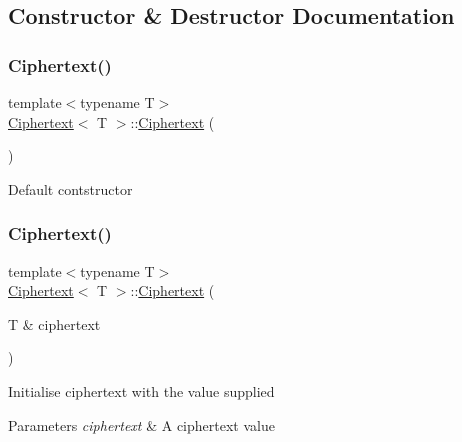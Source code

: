 \subsection{Constructor \& Destructor Documentation}
\mbox{\label{classCiphertext_a658bbd14ee1a3683309878e54b575c8f}} 
\subsubsection{\texorpdfstring{Ciphertext()}{Ciphertext()}\hspace{0.1cm}{\footnotesize\ttfamily [1/2]}}
{\footnotesize\ttfamily template$<$typename T$>$ \\
\hyperlink{classCiphertext}{Ciphertext}$<$ T $>$\+::\hyperlink{classCiphertext}{Ciphertext} (\begin{DoxyParamCaption}{ }\end{DoxyParamCaption})\hspace{0.3cm}{\ttfamily [inline]}}

Default contstructor \mbox{\label{classCiphertext_ab04b602d489978f0e511d797b8a8157d}} 
\subsubsection{\texorpdfstring{Ciphertext()}{Ciphertext()}\hspace{0.1cm}{\footnotesize\ttfamily [2/2]}}
{\footnotesize\ttfamily template$<$typename T$>$ \\
\hyperlink{classCiphertext}{Ciphertext}$<$ T $>$\+::\hyperlink{classCiphertext}{Ciphertext} (\begin{DoxyParamCaption}\item[{T \&}]{ciphertext }\end{DoxyParamCaption})\hspace{0.3cm}{\ttfamily [inline]}}

Initialise ciphertext with the value supplied 
\begin{DoxyParams}{Parameters}
{\em ciphertext} & A ciphertext value \\
\hline
\end{DoxyParams}
\mbox{\label{classCiphertext_ab8a4e685883bcc8fbabde6d3c3cb5fd5}} 
